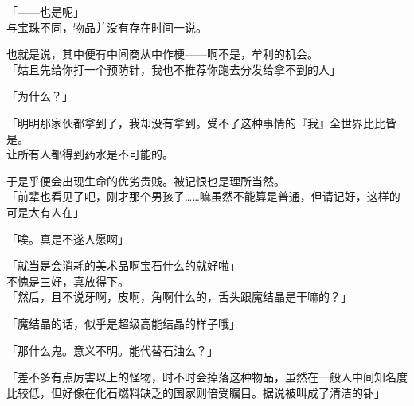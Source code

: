 「——也是呢」\\

与宝珠不同，物品并没有存在时间一说。

也就是说，其中便有中间商从中作梗——啊不是，牟利的机会。\\

「姑且先给你打一个预防针，我也不推荐你跑去分发给拿不到的人」

「为什么？」

「明明那家伙都拿到了，我却没有拿到。受不了这种事情的『我』全世界比比皆是。\\

让所有人都得到药水是不可能的。

于是乎便会出现生命的优劣贵贱。被记恨也是理所当然。\\

「前辈也看见了吧，刚才那个男孩子……嘛虽然不能算是普通，但请记好，这样的可是大有人在」

「唉。真是不遂人愿啊」

「就当是会消耗的美术品啊宝石什么的就好啦」\\

不愧是三好，真放得下。\\

「然后，且不说牙啊，皮啊，角啊什么的，舌头跟魔结晶是干嘛的？」

「魔结晶的话，似乎是超级高能结晶的样子哦」

「那什么鬼。意义不明。能代替石油么？」

「差不多有点厉害以上的怪物，时不时会掉落这种物品，虽然在一般人中间知名度比较低，但好像在化石燃料缺乏的国家则倍受瞩目。据说被叫成了清洁的钋」

